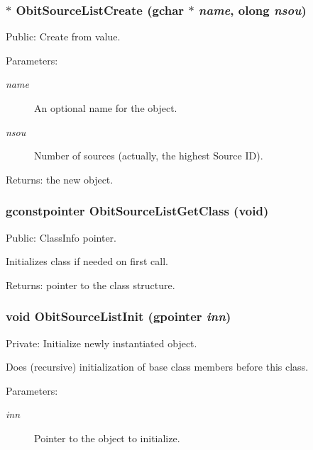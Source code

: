 \subsubsection{$\ast$ Obit\-Source\-List\-Create (gchar $\ast$ {\em name}, {\bf olong} {\em nsou})}\label{ObitSourceList_8c_a8}


Public: Create from value. 

\begin{Desc}
\item[Parameters:]
\begin{description}
\item[{\em name}]An optional name for the object. \item[{\em nsou}]Number of sources (actually, the highest Source ID). \end{description}
\end{Desc}
\begin{Desc}
\item[Returns:]the new object. \end{Desc}
\subsubsection{\setlength{\rightskip}{0pt plus 5cm}gconstpointer Obit\-Source\-List\-Get\-Class (void)}\label{ObitSourceList_8c_a7}


Public: Class\-Info pointer. 

Initializes class if needed on first call. \begin{Desc}
\item[Returns:]pointer to the class structure. \end{Desc}
\subsubsection{\setlength{\rightskip}{0pt plus 5cm}void Obit\-Source\-List\-Init (gpointer {\em inn})}\label{ObitSourceList_8c_a3}


Private: Initialize newly instantiated object. 

Does (recursive) initialization of base class members before this class. \begin{Desc}
\item[Parameters:]
\begin{description}
\item[{\em inn}]Pointer to the object to initialize. \end{description}
\end{Desc}
